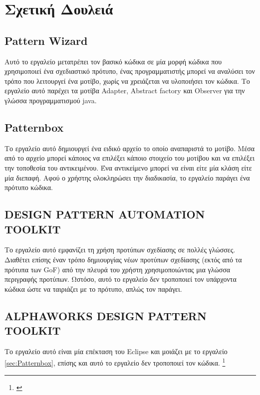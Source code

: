 \chapter{Σχετική Δουλειά}
\label{ch:relativeWork}
\section{Pattern Wizard}
\label{sec:patternWizard}
Αυτό το εργαλείο μετατρέπει τον βασικό κώδικα σε μία μορφή κώδικα που χρησιμοποιεί ένα σχεδιαστικό πρότυπο, 
ένας προγραμματιστής μπορεί να αναλύσει τον τρόπο που λειτουργεί ένα μοτίβο, χωρίς να χρειάζεται να υλοποιήσει τον κώδικα.
Το εργαλείο αυτό παρέχει τα μοτίβα Adapter, Abstract factory και Observer για την γλώσσα προγραμματισμού java.
\section{Patternbox}
Το εργαλείο αυτό δημιουργεί ένα ειδικό αρχείο το οποίο αναπαριστά το μοτίβο. Μέσα από το αρχείο μπορεί κάποιος να 
επιλέξει κάποιο στοιχείο του μοτίβου και να επιλέξει την τοποθεσία του αντικειμένου. Ένα αντικείμενο μπορεί να είναι είτε
μία κλάση είτε μία διεπαφή. Αφού ο χρήστης ολοκληρώσει την διαδικασία, το εργαλείο παράγει ένα πρότυπο κώδικα.
\label{sec:Patternbox}
\section{DESIGN PATTERN AUTOMATION TOOLKIT}
\label{sec:dpa}
Το εργαλείο αυτό  εμφανίζει τη χρήση προτύπων σχεδίασης σε πολλές γλώσσες. Διαθέτει επίσης έναν τρόπο
δημιουργίας νέων προτύπων σχεδίασης (εκτός από τα πρότυπα των GoF) από την πλευρά του χρήστη 
χρησιμοποιώντας μια γλώσσα περιγραφής προτύπων. Ωστόσο, αυτό το εργαλείο δεν τροποποιεί τον υπάρχοντα κώδικα ώστε 
να ταιριάζει με το πρότυπο, απλώς τον παράγει.
\section{ALPHAWORKS DESIGN PATTERN TOOLKIT}
\label{sec:ALPHAWORKS}
Το εργαλείο αυτό είναι μία επέκταση του Eclipse και μοιάζει με το εργαλείο \ref{sec:Patternbox}, επίσης και αυτό το εργαλείο δεν τροποποιεί
τον κώδικα.
\footnote{\cite{patternBox}}